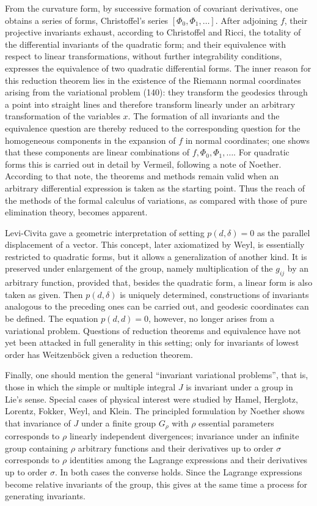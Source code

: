 \documentclass[11pt]{article}
\begin{document}
From the curvature form, by successive formation of covariant derivatives, one obtains a series of forms, Christoffel's series $[\Phi_0,\Phi_1,\ldots]$. After adjoining $f$, their projective invariants exhaust, according to Christoffel and Ricci, the totality of the differential invariants of the quadratic form; and their equivalence with respect to linear transformations, without further integrability conditions, expresses the equivalence of two quadratic differential forms. The inner reason for this reduction theorem lies in the existence of the Riemann normal coordinates arising from the variational problem (140): they transform the geodesics through a point into straight lines and therefore transform linearly under an arbitrary transformation of the variables $x$. The formation of all invariants and the equivalence question are thereby reduced to the corresponding question for the homogeneous components in the expansion of $f$ in normal coordinates; one shows that these components are linear combinations of $f,\Phi_0,\Phi_1,\ldots$. For quadratic forms this is carried out in detail by Vermeil, following a note of Noether. According to that note, the theorems and methods remain valid when an arbitrary differential expression is taken as the starting point. Thus the reach of the methods of the formal calculus of variations, as compared with those of pure elimination theory, becomes apparent.

Levi-Civita gave a geometric interpretation of setting $p(d,\delta)=0$ as the parallel displacement of a vector. This concept, later axiomatized by Weyl, is essentially restricted to quadratic forms, but it allows a generalization of another kind. It is preserved under enlargement of the group, namely multiplication of the $g_{ij}$ by an arbitrary function, provided that, besides the quadratic form, a linear form is also taken as given. Then $p(d,\delta)$ is uniquely determined, constructions of invariants analogous to the preceding ones can be carried out, and geodesic coordinates can be defined. The equation $p(d,d)=0$, however, no longer arises from a variational problem. Questions of reduction theorems and equivalence have not yet been attacked in full generality in this setting; only for invariants of lowest order has Weitzenböck given a reduction theorem.

Finally, one should mention the general ``invariant variational problems'', that is, those in which the simple or multiple integral $J$ is invariant under a group in Lie's sense. Special cases of physical interest were studied by Hamel, Herglotz, Lorentz, Fokker, Weyl, and Klein. The principled formulation by Noether shows that invariance of $J$ under a finite group $G_\rho$ with $\rho$ essential parameters corresponds to $\rho$ linearly independent divergences; invariance under an infinite group containing $\rho$ arbitrary functions and their derivatives up to order $\sigma$ corresponds to $\rho$ identities among the Lagrange expressions and their derivatives up to order $\sigma$. In both cases the converse holds. Since the Lagrange expressions become relative invariants of the group, this gives at the same time a process for generating invariants.
\end{document}
